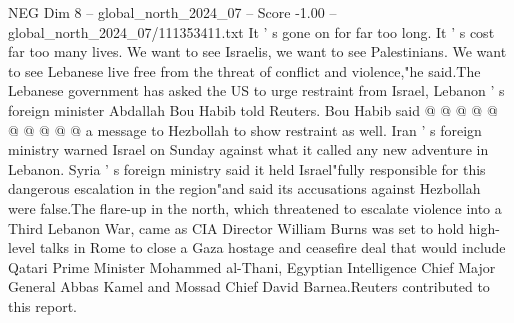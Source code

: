 \begin{textsample}{NEG Dim 8 – global\_north\_2024\_07 – Score -1.00 – global\_north\_2024\_07/111353411.txt}
It ' s gone on for far too long.
It ' s cost far too many lives.
We want to see Israelis, we want to see Palestinians.
We want to see Lebanese live free from the threat of conflict and violence,"he said.The Lebanese government has asked the US to urge restraint from Israel, Lebanon ' s foreign minister Abdallah Bou Habib told Reuters.
Bou Habib said @ @ @ @ @ @ @ @ @ @ a message to Hezbollah to show restraint as well.
Iran ' s foreign ministry warned Israel on Sunday against what it called any new adventure in Lebanon.
Syria ' s foreign ministry said it held Israel"fully responsible for this dangerous escalation in the region"and said its accusations against Hezbollah were false.The flare-up in the north, which threatened to escalate violence into a Third Lebanon War, came as CIA Director William Burns was set to hold high-level talks in Rome to close a Gaza hostage and ceasefire deal that would include Qatari Prime Minister Mohammed al-Thani, Egyptian Intelligence Chief Major General Abbas Kamel and Mossad Chief David Barnea.Reuters contributed to this report.

\end{textsample}
